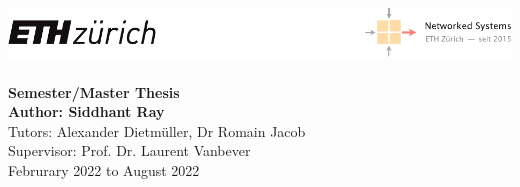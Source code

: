 \documentclass[11pt,oneside]{book}
\begin{document}
\begin{titlepage}
    \centering
    \includegraphics[width=\textwidth]{figures/eth-nsg-header}\\[60mm]
    {\Huge\bf{}}\\[10mm]
    {\Large\bf\sf Semester/Master Thesis}\\[3mm]
    {\Large\bf\sf Author: Siddhant Ray } \\[5mm]
    {\sf Tutors: Alexander Dietmüller, Dr Romain Jacob}\\[5mm]
    {\sf Supervisor: Prof. Dr. Laurent Vanbever}\\[30mm]
    {\sf Februrary 2022 to August 2022}
\end{titlepage}

\thispagestyle{empty}
\newpage
{}


\clearpage
\setcounter{tocdepth}{2}
\tableofcontents
\clearpage









\clearpage




\clearpage
\appendix
{}


\end{document}
